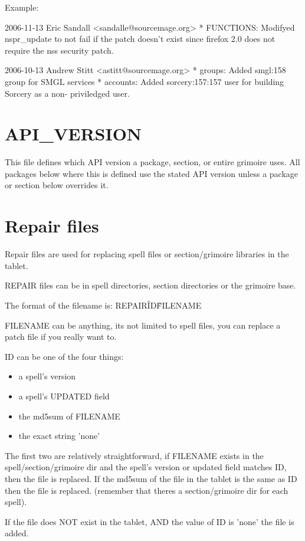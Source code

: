 \documentclass[a4paper,10pt]{book}
\begin{document}
Example:
\begin{verbatim*}
2006-11-13 Eric Sandall <sandalle@sourcemage.org>
	* FUNCTIONS: Modifyed nspr_update to not fail if the patch doesn't
	  exist	since firefox 2.0 does not require the nss security patch.

2006-10-13 Andrew Stitt <astitt@sourcemage.org>
	* groups: Added smgl:158 group for SMGL services
	* accounts: Added sorcery:157:157 user for building Sorcery as a non-
	  priviledged user.
\end{verbatim*}

\section{API\_VERSION}
This file defines which API version a package, section, or entire grimoire
uses. All packages below where this is defined use the stated API version
unless a package or section below overrides it.

\section{Repair files}
Repair files are used for replacing spell files or section/grimoire libraries
in the tablet.

REPAIR files can be in spell directories, section directories or the grimoire
base.

The format of the filename is: REPAIR\^ID\^FILENAME

FILENAME can be anything, its not limited to spell files, you can replace a
patch file if you really want to.

ID can be one of the four things:
\begin{itemize}
\item a spell's version
\item a spell's UPDATED field
\item the md5sum of FILENAME
\item the exact string 'none'
\end{itemize}

The first two are relatively straightforward, if FILENAME exists in the
spell/section/grimoire dir and the spell's version or updated field matches ID,
then the file is replaced. If the md5sum of the file in the tablet is the same
as ID then the file is replaced. (remember that theres a section/grimoire dir
for each spell).

If the file does NOT exist in the tablet, AND the value of ID is 'none' the
file is added.
\end{document}
